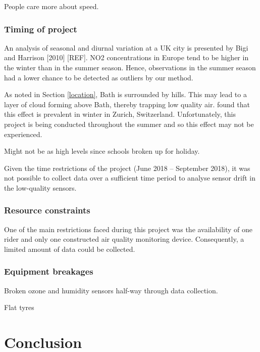 \documentclass[11pt]{report}
\begin{document}
People care more about speed.

\subsection{Timing of project}

An analysis of seasonal and diurnal variation at a UK city is presented by Bigi and Harrison [2010] [REF]. NO2 concentrations in Europe tend to be higher in the winter than in the summer season. Hence, observations in the summer season had a lower chance to be detected as outliers by our method.

As noted in Section \ref{location}, Bath is surrounded by hills. This may lead to a layer of cloud forming above Bath, thereby trapping low quality air. \cite{Hasenfratz2015highresmapsTram} found that this effect is prevalent in winter in Zurich, Switzerland. Unfortunately, this project is being conducted throughout the summer and so this effect may not be experienced. 

Might not be as high levels since schools broken up for holiday.

Given the time restrictions of the project (June 2018 -- September 2018), it was not possible to collect data over a sufficient time period to analyse sensor drift in the low-quality sensors.

\subsection{Resource constraints}

One of the main restrictions faced during this project was the availability of one rider and only one constructed air quality monitoring device. Consequently, a limited amount of data could be collected.

\subsection{Equipment breakages}

Broken ozone and humidity sensors half-way through data collection.

Flat tyres



\chapter{Conclusion} \label{chap: conclusion}
\end{document}
